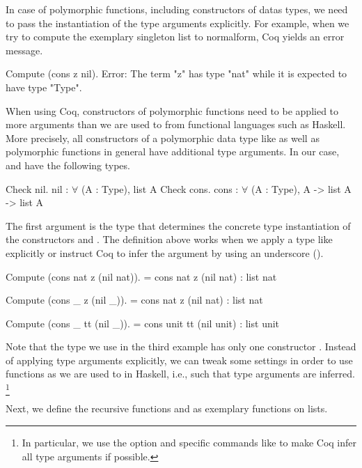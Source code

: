 In case of polymorphic functions, including constructors of datas types, we need to pass the instantiation of the type arguments explicitly.
For example, when we try to compute the exemplary singleton list  to normalform, Coq yields an error message.

\begin{crepl}
\coqrepl Compute (cons z nil).
Error: The term "z" has type "nat" while it is expected to have type
       "Type".
\end{crepl}

When using Coq, constructors of polymorphic functions need to be applied to more arguments than we are used to from functional languages such as Haskell.
More precisely, all constructors of a polymorphic data type like  as well as polymorphic functions in general have additional type arguments.
In our case,  and  have the following types.

\begin{crepl}
\coqrepl Check nil.
   nil : \(\forall\) (A : Type), list A
\coqrepl Check cons.
   cons : \(\forall\) (A : Type), A -> list A -> list A
\end{crepl}

The first argument is the type that determines the concrete type instantiation of the constructors  and .
The definition above works when we apply a type like  explicitly or instruct Coq to infer the argument by using an underscore (\cinl{_}).

\begin{crepl}
\coqrepl Compute (cons nat z (nil nat)).
    = cons nat z (nil nat)
    : list nat

\coqrepl Compute (cons _ z (nil _)).
    = cons nat z (nil nat)
    : list nat

\coqrepl Compute (cons _ tt (nil _)).
    = cons unit tt (nil unit)
    : list unit
\end{crepl}

Note that the type  we use in the third example has only one constructor .
Instead of applying type arguments explicitly, we can tweak some settings in order to use functions as we are used to in Haskell, i.e., such that type arguments are inferred. \footnote{In particular, we use the option  and specific commands like  to make Coq infer all type arguments if possible.}

Next, we define the recursive functions  and  as exemplary functions on lists.

